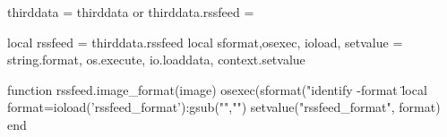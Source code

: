 \startluacode
  thirddata = thirddata or {}
  thirddata.rssfeed = {}

  local rssfeed = thirddata.rssfeed
  local sformat,osexec, ioload, setvalue = string.format, os.execute, io.loaddata, context.setvalue

  function rssfeed.image_format(image) 
    osexec(sformat("identify -format \"%
    local format=ioload('rssfeed_format'):gsub("\n","")
    setvalue("rssfeed_format", format)
  end
\stopluacode

\protect
\stopmodule
